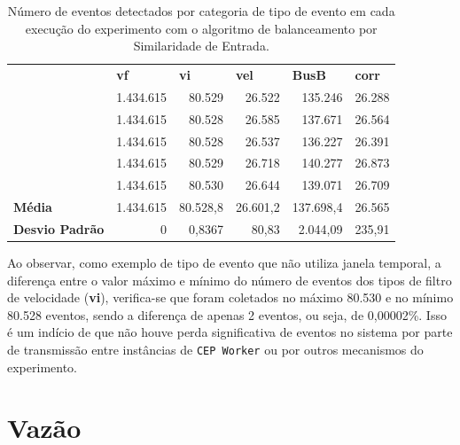 \begin{table}[h!]
\centering
\caption{Número de eventos detectados por categoria de tipo de evento em cada execução do experimento com o algoritmo de balanceamento por Similaridade de Entrada.}
\begin{tabular}{lrrrrr}
          & \multicolumn{1}{l}{\textbf{vf}} & \multicolumn{1}{l}{\textbf{vi}} & \multicolumn{1}{l}{\textbf{vel}} & \multicolumn{1}{l}{\textbf{BusB}} & \multicolumn{1}{l}{\textbf{corr}}  \\
  & 1.434.615 & 80.529   & 26.522    & 135.246    & 26.288                     \\
  & 1.434.615 & 80.528   & 26.585    & 137.671    & 26.564                     \\
  & 1.434.615 & 80.528   & 26.537    & 136.227    & 26.391                     \\
  & 1.434.615 & 80.529   & 26.718    & 140.277    & 26.873                     \\
 & 1.434.615 & 80.530   & 26.644    & 139.071    & 26.709                     \\
\textbf{Média}          & 1.434.615 & 80.528,8 & 26.601,2  & 137.698,4  & 26.565                     \\
\textbf{Desvio Padrão}           & 0       & 0,8367      & 80,83        & 2.044,09         & 235,91         
\end{tabular}
\label{Tab:events_IS_and_avg}
\end{table}


Ao observar, como exemplo de tipo de evento que não utiliza janela temporal, a diferença entre o valor máximo e mínimo do número de eventos dos tipos de filtro de velocidade (\textbf{vi}), verifica-se que foram coletados no máximo 80.530 e no mínimo 80.528 eventos, sendo a diferença de apenas 2 eventos, ou seja, de 0,00002\%. Isso é um indício de que não houve perda significativa de eventos no sistema por parte de transmissão entre instâncias de \texttt{CEP Worker} ou por outros mecanismos do experimento.









\section{Vazão}
\label{sec:vazao}


